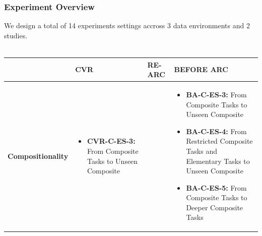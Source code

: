 \subsubsection{Experiment Overview}\label{tab:experiment_table}

We design a total of 14 experiments settings accross 3 data environments and 2 studies. \\
\\ 

\renewcommand{\arraystretch}{1.5}
\begin{tabular}{|>{\raggedright\arraybackslash}p{2.8cm} 
                |>{\raggedright\arraybackslash}p{3.8cm} 
                |>{\raggedright\arraybackslash}p{3.8cm} 
                |>{\raggedright\arraybackslash}p{4cm}|}
\hline
\vspace{-0.8em} \textbf{} & \textbf{CVR} & \textbf{RE-ARC} & \textbf{BEFORE ARC} \\
\hline

\textbf{Compositionality} & 
\begin{itemize}
  \item \textbf{CVR-C-ES-3:} From Composite Tasks to Unseen Composite
\end{itemize}
& 

& 
\begin{itemize}
  \item \textbf{BA-C-ES-3:} From Composite Tasks to Unseen Composite
  \item \textbf{BA-C-ES-4:} From Restricted Composite Tasks and Elementary Tasks to Unseen Composite
  \item \textbf{BA-C-ES-5:} From Composite Tasks to Deeper Composite Tasks
\end{itemize} \\
\hline


\end{tabular}
